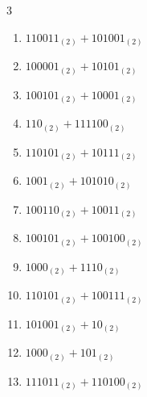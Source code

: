 \begin{multicols}{3}
\begin{enumerate}

  \item $110011_{(2)} + 101001_{(2)}$


  \item $100001_{(2)} + 10101_{(2)}$


\columnbreak %

\resetques

  \item $100101_{(2)} + 10001_{(2)}$


  \item $110_{(2)} + 111100_{(2)}$


  \item $110101_{(2)} + 10111_{(2)}$


  \item $1001_{(2)} + 101010_{(2)}$


  \item $100110_{(2)} + 10011_{(2)}$


  \item $100101_{(2)} + 100100_{(2)}$


  \item $1000_{(2)} + 1110_{(2)}$


  \item $110101_{(2)} + 100111_{(2)}$


  \item $101001_{(2)} + 10_{(2)}$


  \item $1000_{(2)} + 101_{(2)}$


\columnbreak %

  \item $111011_{(2)} + 110100_{(2)}$


\end{enumerate}
\end{multicols}
